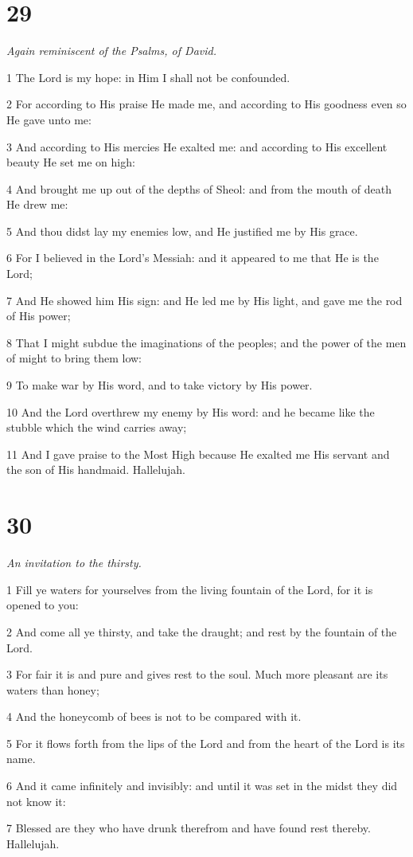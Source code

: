 \chapter{29}

\par \textit{Again reminiscent of the Psalms, of David.}

\par 1 The Lord is my hope: in Him I shall not be confounded.
\par 2 For according to His praise He made me, and according to His goodness even so He gave unto me:
\par 3 And according to His mercies He exalted me: and according to His excellent beauty He set me on high:
\par 4 And brought me up out of the depths of Sheol: and from the mouth of death He drew me:
\par 5 And thou didst lay my enemies low, and He justified me by His grace.
\par 6 For I believed in the Lord's Messiah: and it appeared to me that He is the Lord;
\par 7 And He showed him His sign: and He led me by His light, and gave me the rod of His power;
\par 8 That I might subdue the imaginations of the peoples; and the power of the men of might to bring them low:
\par 9 To make war by His word, and to take victory by His power.
\par 10 And the Lord overthrew my enemy by His word: and he became like the stubble which the wind carries away;
\par 11 And I gave praise to the Most High because He exalted me His servant and the son of His handmaid. Hallelujah.

\chapter{30}

\par \textit{An invitation to the thirsty.}

\par 1 Fill ye waters for yourselves from the living fountain of the Lord, for it is opened to you:
\par 2 And come all ye thirsty, and take the draught; and rest by the fountain of the Lord.
\par 3 For fair it is and pure and gives rest to the soul. Much more pleasant are its waters than honey;
\par 4 And the honeycomb of bees is not to be compared with it.
\par 5 For it flows forth from the lips of the Lord and from the heart of the Lord is its name.
\par 6 And it came infinitely and invisibly: and until it was set in the midst they did not know it:
\par 7 Blessed are they who have drunk therefrom and have found rest thereby. Hallelujah.

